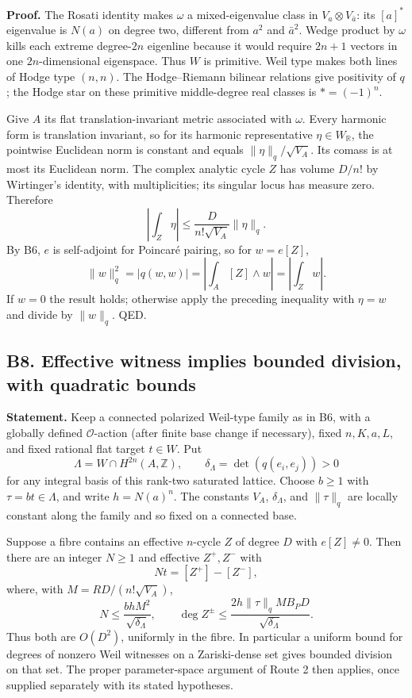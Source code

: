 \textbf{Proof.} The Rosati identity makes \(\omega\) a mixed-eigenvalue class in \(V_a\otimes V_{\bar a}\): its \([a]^*\) eigenvalue is \(N(a)\) on degree two, different from \(a^2\) and \(\bar a^2\). Wedge product by \(\omega\) kills each extreme degree-\(2n\) eigenline because it would require \(2n+1\) vectors in one \(2n\)-dimensional eigenspace. Thus \(W\) is primitive. Weil type makes both lines of Hodge type \((n,n)\). The Hodge--Riemann bilinear relations give positivity of \(q\); the Hodge star on these primitive middle-degree real classes is \(*=(-1)^n\).

Give \(A\) its flat translation-invariant metric associated with \(\omega\). Every harmonic form is translation invariant, so for its harmonic representative \(\eta\in W_\mathbb R\), the pointwise Euclidean norm is constant and equals \(\|\eta\|_q/\sqrt{V_A}\). Its comass is at most its Euclidean norm. The complex analytic cycle \(Z\) has volume \(D/n!\) by Wirtinger's identity, with multiplicities; its singular locus has measure zero. Therefore \[
 \left|\int_Z\eta\right|\leq\frac{D}{n!\sqrt{V_A}}\|\eta\|_q.
\] By B6, \(e\) is self-adjoint for Poincaré pairing, so for \(w=e[Z]\), \[
 \|w\|_q^2=|q(w,w)|=\left|\int_A[Z]\wedge w\right|=\left|\int_Zw\right|.
\] If \(w=0\) the result holds; otherwise apply the preceding inequality with \(\eta=w\) and divide by \(\|w\|_q\). QED.

\subsection{B8. Effective witness implies bounded division, with quadratic bounds}\label{b8.-effective-witness-implies-bounded-division-with-quadratic-bounds}

\textbf{Statement.} Keep a connected polarized Weil-type family as in B6, with a globally defined \(\mathcal O\)-action (after finite base change if necessary), fixed \(n,K,a,L\), and fixed rational flat target \(t\in W\). Put \[
 \Lambda=W\cap H^{2n}(A,\mathbb Z),\qquad \delta_\Lambda=\det(q(e_i,e_j))>0
\] for any integral basis of this rank-two saturated lattice. Choose \(b\geq1\) with \(\tau=bt\in\Lambda\), and write \(h=N(a)^n\). The constants \(V_A\), \(\delta_\Lambda\), and \(\|\tau\|_q\) are locally constant along the family and so fixed on a connected base.

Suppose a fibre contains an effective \(n\)-cycle \(Z\) of degree \(D\) with \(e[Z]\ne0\). Then there are an integer \(N\geq1\) and effective \(Z^+,Z^-\) with \[
 Nt=[Z^+]-[Z^-],
\] where, with \(M=RD/(n!\sqrt{V_A})\), \[
 N\leq\frac{b h M^2}{\sqrt{\delta_\Lambda}},\qquad
 \deg Z^\pm\leq\frac{2h\|\tau\|_q M B_P D}{\sqrt{\delta_\Lambda}}.
\] Thus both are \(O(D^2)\), uniformly in the fibre. In particular a uniform bound for degrees of nonzero Weil witnesses on a Zariski-dense set gives bounded division on that set. The proper parameter-space argument of Route 2 then applies, once supplied separately with its stated hypotheses.

